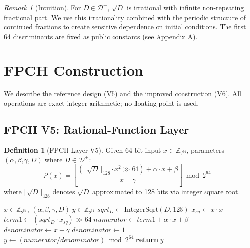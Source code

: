 \documentclass[11pt,a4paper]{article}
\theoremstyle{plain}
\theoremstyle{definition}
\newtheorem{definition}{Definition}[section]
\theoremstyle{remark}
\newtheorem{remark}{Remark}[section]
\begin{document}
\begin{remark}[Intuition]
For $D \in \mathcal{D}^+$, $\sqrt{D}$ is irrational with infinite non-repeating fractional part. We use this irrationality combined with the periodic structure of continued fractions to create sensitive dependence on initial conditions. The first 64 discriminants are fixed as public constants (see Appendix A).
\end{remark}

\section{FPCH Construction}\label{sec:construction}

We describe the reference design (V5) and the improved construction (V6). All operations are exact integer arithmetic; no floating-point is used.

\subsection{FPCH V5: Rational-Function Layer}

\begin{definition}[FPCH Layer V5]\label{def:fpch}
Given 64-bit input $x \in \mathbb{Z}_{2^{64}}$, parameters $(\alpha, \beta, \gamma, D)$ where $D \in \mathcal{D}^+$:
\begin{equation}
P(x) = \left\lfloor \frac{(\lfloor\sqrt{D}\rfloor_{128} \cdot x^2 \gg 64) + \alpha \cdot x + \beta}{x + \gamma} \right\rfloor \bmod 2^{64}
\end{equation}
where $\lfloor\sqrt{D}\rfloor_{128}$ denotes $\sqrt{D}$ approximated to 128 bits via integer square root.
\end{definition}

\begin{algorithm}[H]
\caption{FPCH V5 Single Layer}
\begin{algorithmic}[1]
\Require $x \in \mathbb{Z}_{2^{64}}$, $(\alpha, \beta, \gamma, D)$
\Ensure $y \in \mathbb{Z}_{2^{64}}$
\State $sqrt_D \gets \text{IntegerSqrt}(D, 128)$
\State $x_{sq} \gets x \cdot x$
\State $term1 \gets (sqrt_D \cdot x_{sq}) \gg 64$
\State $numerator \gets term1 + \alpha \cdot x + \beta$
\State $denominator \gets x + \gamma$
    \State $denominator \gets 1$
\EndIf
\State $y \gets (numerator / denominator) \bmod 2^{64}$
\State \textbf{return} $y$
\end{algorithmic}
\end{algorithm}
\end{document}
